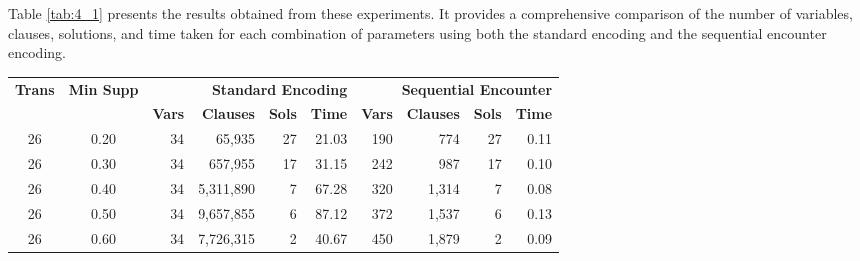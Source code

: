 Table \ref{tab:4_1} presents the results obtained from these experiments.
It provides a comprehensive comparison of the number of variables, clauses, solutions, and time taken for each combination of parameters using both the standard encoding and the sequential encounter encoding.
\begin{table}[H]
    \centering
    \begin{tabular}{|c|c|r|r|r|r|r|r|r|r|}
        \hline
        \multirow{2}{*}{\textbf{Trans}} & \multirow{2}{*}{\textbf{Min Supp}} & \multicolumn{4}{r|}{\textbf{Standard Encoding}} & \multicolumn{4}{r|}{\textbf{Sequential Encounter}}                                                                                                    \\ \cline{3-10}
                                        &                                    & \textbf{Vars}                                   & \textbf{Clauses}                                   & \textbf{Sols} & \textbf{Time} & \textbf{Vars} & \textbf{Clauses} & \textbf{Sols} & \textbf{Time} \\ \hline
        26                              & 0.20                               & 34                                              & 65,935                                             & 27            & 21.03         & 190           & 774              & 27            & 0.11          \\ \hline
        26                              & 0.30                               & 34                                              & 657,955                                            & 17            & 31.15         & 242           & 987              & 17            & 0.10          \\ \hline
        26                              & 0.40                               & 34                                              & 5,311,890                                          & 7             & 67.28         & 320           & 1,314            & 7             & 0.08          \\ \hline
        26                              & 0.50                               & 34                                              & 9,657,855                                          & 6             & 87.12         & 372           & 1,537            & 6             & 0.13          \\ \hline
        26                              & 0.60                               & 34                                              & 7,726,315                                          & 2             & 40.67         & 450           & 1,879            & 2             & 0.09          \\ \hline

\end{tabular}
\end{table}
